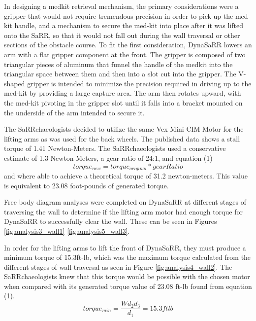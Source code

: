 In designing a medkit retrieval mechanism, the primary considerations were a gripper that would not require tremendous precision in order to pick up the med-kit handle, and a mechanism to secure the med-kit into place after it was lifted onto the SaRR, so that it would not fall out during the wall traversal or other sections of the obstacle course. To fit the first consideration, DynaSaRR lowers an arm with a flat gripper component at the front. The gripper is composed of two triangular pieces of aluminum that funnel the handle of the medkit into the triangular space between them and then into a slot cut into the gripper. The V-shaped gripper is intended to minimize the precision required in driving up to the med-kit by providing a large capture area. The arm then rotates upward, with the med-kit pivoting in the gripper slot until it falls into a bracket mounted on the underside of the arm intended to secure it.

The SaRRchaeologists decided to utilize the same Vex Mini CIM Motor for the lifting arms as was used for the back wheels. The published data shows a stall torque of 1.41 Newton-Meters. The SaRRchaeologists used a conservative estimate of 1.3 Newton-Meters, a gear ratio of 24:1, and equation (1) 
\begin{equation}
    torque_{new} = torque_{original} * gearRatio
\end{equation}
and where able to achieve a theoretical torque of 31.2 newton-meters. This value is equivalent to 23.08 foot-pounds of generated torque. 

Free body diagram analyses were completed on DynaSaRR at different stages of traversing the wall to determine if the lifting arm motor had enough torque for DynaSaRR to successfully clear the wall.  These can be seen in Figures \ref{fig:analysis3_wall1}-\ref{fig:analysis5_wall3}.

In order for the lifting arms to lift the front of DynaSaRR, they must produce a minimum torque of 15.3ft-lb, which was the maximum torque calculated from the different stages of wall traversal as seen in Figure \ref{fig:analysis4_wall2}.  The SaRRchaeologists knew that this torque would be possible with the chosen motor when compared with its generated torque value of 23.08 ft-lb found from equation (1).
\begin{equation}
    torque_{min} = \frac{Wd_{2}d_{3}}{d_{1}} = 15.3 ftlb
\end{equation}

